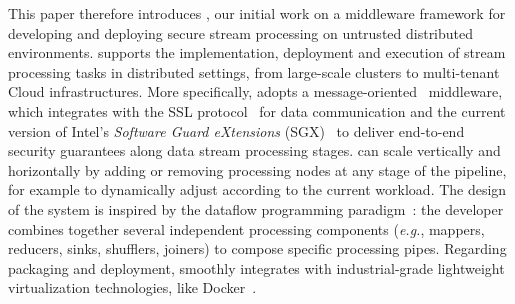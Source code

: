 This paper therefore introduces \SYS{}, our initial work on a middleware framework for developing and deploying secure stream processing on untrusted distributed environments.
\SYS{} supports the implementation, deployment and execution of stream processing tasks in distributed settings, from large-scale clusters to multi-tenant Cloud infrastructures.
More specifically, \SYS{} adopts a message-oriented~\cite{mom} middleware, which integrates with the SSL protocol~\cite{freier2011secure} for data communication and the current version of Intel's \emph{Software Guard eXtensions} (SGX)~\cite{costan_intel} to deliver end-to-end security guarantees along data stream processing stages.
\SYS{} can scale vertically and horizontally by adding or removing processing nodes at any stage of the pipeline, for example to dynamically adjust according to the current workload.
% 
% 
The design of the \SYS{} system is inspired by the dataflow programming paradigm~\cite{uustalu_essence_2005}: the developer combines together several independent processing components (\emph{e.g.}, mappers, reducers, sinks, shufflers, joiners) to compose specific processing pipes.
Regarding packaging and deployment, \SYS{} smoothly integrates with industrial-grade lightweight virtualization technologies, like Docker~\cite{docker}.



